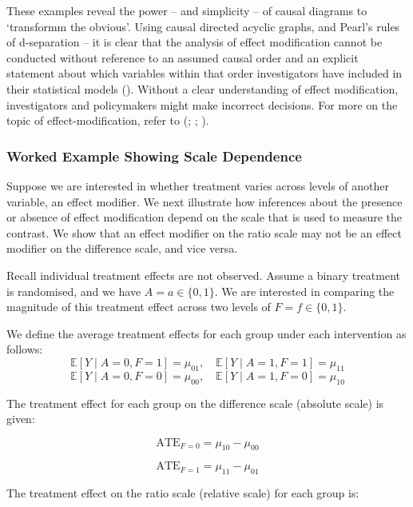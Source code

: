 \documentclass[
  single column]{article}
\begin{document}
These examples reveal the power -- and simplicity -- of causal diagrams
to `transformm the obvious'. Using causal directed acyclic graphs, and
Pearl's rules of d-separation -- it is clear that the analysis of effect
modification cannot be conducted without reference to an assumed causal
order and an explicit statement about which variables within that order
investigators have included in their statistical models
(). Without a clear
understanding of effect modification, investigators and policymakers
might make incorrect decisions. For more on the topic of
effect-modification, refer to
(;
;
).

\subsubsection{Worked Example Showing Scale
Dependence}\label{worked-example-showing-scale-dependence}

Suppose we are interested in whether treatment varies across levels of
another variable, an effect modifier. We next illustrate how inferences
about the presence or absence of effect modification depend on the scale
that is used to measure the contrast. We show that an effect modifier on
the ratio scale may not be an effect modifier on the difference scale,
and vice versa.

Recall individual treatment effects are not observed. Assume a binary
treatment is randomised, and we have \(A = a \in \{0,1\}\). We are
interested in comparing the magnitude of this treatment effect across
two levels of \(F = f \in \{0,1\}\).

We define the average treatment effects for each group under each
intervention as follows: \[
\mathbb{E}[Y \mid A = 0, F = 1] = \mu_{01}, \quad \mathbb{E}[Y \mid  A = 1, F = 1] = \mu_{11}
\] \[
\mathbb{E}[Y \mid  A = 0, F = 0] = \mu_{00}, \quad \mathbb{E}[Y \mid A = 1, F = 0] = \mu_{10}
\]

The treatment effect for each group on the difference scale (absolute
scale) is given:

\[
\text{ATE}_{F = 0} = \mu_{10} - \mu_{00}
\]

\[
\text{ATE}_{F = 1} = \mu_{11} - \mu_{01}
\]

The treatment effect on the ratio scale (relative scale) for each group
is:
\end{document}
